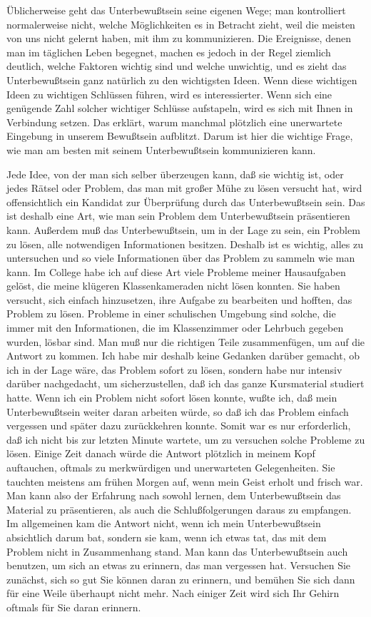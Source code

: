 Üblicherweise geht das Unterbewußtsein seine eigenen Wege; man kontrolliert normalerweise nicht, welche Möglichkeiten es in Betracht zieht, weil die meisten von uns nicht gelernt haben, mit ihm zu kommunizieren.
 Die Ereignisse, denen man im täglichen Leben begegnet, machen es jedoch in der Regel ziemlich deutlich, welche Faktoren wichtig sind und welche unwichtig, und es zieht das Unterbewußtsein ganz natürlich zu den wichtigsten Ideen.
 Wenn diese wichtigen Ideen zu wichtigen Schlüssen führen, wird es interessierter.
 Wenn sich eine genügende Zahl solcher wichtiger Schlüsse aufstapeln, wird es sich mit Ihnen in Verbindung setzen.
 Das erklärt, warum manchmal plötzlich eine unerwartete Eingebung in unserem Bewußtsein aufblitzt.
 Darum ist hier die wichtige Frage, wie man am besten mit seinem Unterbewußtsein kommunizieren kann.
 

Jede Idee, von der man sich selber überzeugen kann, daß sie wichtig ist, oder jedes Rätsel oder Problem, das man mit großer Mühe zu lösen versucht hat, wird offensichtlich ein Kandidat zur Überprüfung durch das Unterbewußtsein sein.
 Das ist deshalb eine Art, wie man sein Problem dem Unterbewußtsein präsentieren kann.
 Außerdem muß das Unterbewußtsein, um in der Lage zu sein, ein Problem zu lösen, alle notwendigen Informationen besitzen.
 Deshalb ist es wichtig, alles zu untersuchen und so viele Informationen über das Problem zu sammeln wie man kann.
 Im College habe ich auf diese Art viele Probleme meiner Hausaufgaben gelöst, die meine klügeren Klassenkameraden nicht lösen konnten.
 Sie haben versucht, sich einfach hinzusetzen, ihre Aufgabe zu bearbeiten und hofften, das Problem zu lösen.
 Probleme in einer schulischen Umgebung sind solche, die immer mit den Informationen, die im Klassenzimmer oder Lehrbuch gegeben wurden, lösbar sind.
 Man muß nur die richtigen Teile zusammenfügen, um auf die Antwort zu kommen.
 Ich habe mir deshalb keine Gedanken darüber gemacht, ob ich in der Lage wäre, das Problem sofort zu lösen, sondern habe nur intensiv darüber nachgedacht, um sicherzustellen, daß ich das ganze Kursmaterial studiert hatte.
 Wenn ich ein Problem nicht sofort lösen konnte, wußte ich, daß mein Unterbewußtsein weiter daran arbeiten würde, so daß ich das Problem einfach vergessen und später dazu zurückkehren konnte.
 Somit war es nur erforderlich, daß ich nicht bis zur letzten Minute wartete, um zu versuchen solche Probleme zu lösen.
 Einige Zeit danach würde die Antwort plötzlich in meinem Kopf auftauchen, oftmals zu merkwürdigen und unerwarteten Gelegenheiten.
 Sie tauchten meistens am frühen Morgen auf, wenn mein Geist erholt und frisch war.
 Man kann also der Erfahrung nach sowohl lernen, dem Unterbewußtsein das Material zu präsentieren, als auch die Schlußfolgerungen daraus zu empfangen.
 Im allgemeinen kam die Antwort nicht, wenn ich mein Unterbewußtsein absichtlich darum bat, sondern sie kam, wenn ich etwas tat, das mit dem Problem nicht in Zusammenhang stand.
 Man kann das Unterbewußtsein auch benutzen, um sich an etwas zu erinnern, das man vergessen hat.
 Versuchen Sie zunächst, sich so gut Sie können daran zu erinnern, und bemühen Sie sich dann für eine Weile überhaupt nicht mehr.
 Nach einiger Zeit wird sich Ihr Gehirn oftmals für Sie daran erinnern.
 


